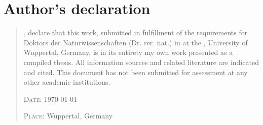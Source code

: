 \chapter*{Author's declaration}
\begin{SingleSpace}
\begin{quote}
,  
\emph{\utsname} 
declare that this work, submitted in fulfillment of the requirements for Doktors der Naturwissenschaften (Dr. rer. nat.) in \emph{\utsfield} at the 
\emph{\utsfaculty}, University of Wuppertal, Germany,
is in its entirety my own work presented as a compiled thesis. All information sources and related literature are indicated and cited. This document has not been submitted for assessment at any other academic institutions. 



\noindent

\vspace{1.5cm}
\noindent
{}


\vspace{0.35cm}
\noindent 
\hspace{-0.75cm}\textsc{Date: \today}

\noindent 
\hspace{-0.75cm}\textsc{Place: } Wuppertal, Germany

\end{quote}
\end{SingleSpace}
\clearpage